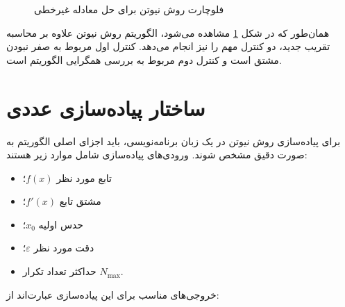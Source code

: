 \begin{figure}[H]

\caption{فلوچارت روش نیوتن برای حل معادله غیرخطی}
\label{fig:newton-flowchart}
\end{figure}

همان‌طور که در شکل \ref{fig:newton-flowchart} مشاهده می‌شود، الگوریتم روش نیوتن علاوه بر محاسبه تقریب جدید، دو کنترل مهم را نیز انجام می‌دهد. کنترل اول مربوط به صفر نبودن مشتق است و کنترل دوم مربوط به بررسی همگرایی الگوریتم است.

\section{ساختار پیاده‌سازی عددی}

برای پیاده‌سازی روش نیوتن در یک زبان برنامه‌نویسی، باید اجزای اصلی الگوریتم به صورت دقیق مشخص شوند. ورودی‌های پیاده‌سازی شامل موارد زیر هستند:

\begin{itemize}
    \item تابع مورد نظر \(f(x)\)؛
    \item مشتق تابع \(f'(x)\)؛
    \item حدس اولیه \(x_0\)؛
    \item دقت مورد نظر \(\varepsilon\)؛
    \item حداکثر تعداد تکرار \(N_{\max}\).
\end{itemize}

خروجی‌های مناسب برای این پیاده‌سازی عبارت‌اند از:

